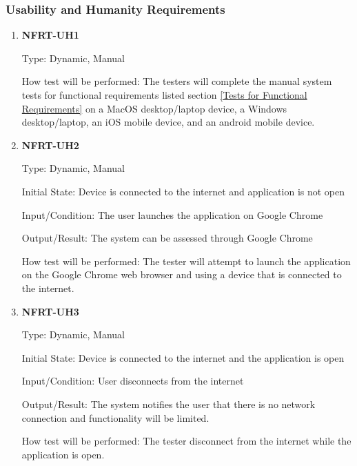 \documentclass[12pt, titlepage]{article}
\begin{document}


\subsubsection{Usability and Humanity Requirements}
\begin{enumerate}

	\item \textbf{NFRT-UH1} %

	      Type: Dynamic, Manual

	      How test will be performed: The testers will complete the manual system tests for functional
	      requirements listed section \ref{Tests for Functional Requirements} on a MacOS desktop/laptop
	      device, a Windows desktop/laptop, an iOS mobile device, and an android mobile device.

	\item \textbf{NFRT-UH2} %

	      Type: Dynamic, Manual

	      Initial State: Device is connected to the internet and application is not open

	      Input/Condition: The user launches the application on Google Chrome

	      Output/Result: The system can be assessed through Google Chrome

	      How test will be performed: The tester will attempt to launch the application on the Google Chrome
	      web browser and using a device that is connected to the internet.

	\item \textbf{NFRT-UH3} %

	      Type: Dynamic, Manual

	      Initial State: Device is connected to the internet and the application is open

	      Input/Condition: User disconnects from the internet

	      Output/Result: The system notifies the user that there is no network connection and functionality
	      will be limited.

	      How test will be performed: The tester disconnect from the internet while the application is open.

\end{enumerate}
\end{document}

